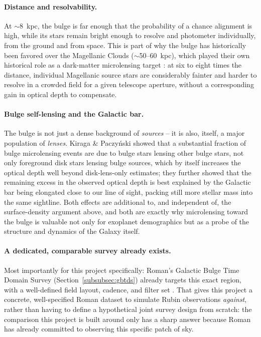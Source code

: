 \documentclass[english,10pt,a4paper]{article}
\begin{document}
	\paragraph{Distance and resolvability.} At $\sim$8~kpc, the bulge is far enough that the probability of a chance alignment is high, while its stars remain bright enough to resolve and photometer individually, from the ground and from space. This is part of why the bulge has historically been favored over the Magellanic Clouds ($\sim$50--60~kpc), which played their own historical role as a dark-matter microlensing target \cite{Paczynski1991}: at six to eight times the distance, individual Magellanic source stars are considerably fainter and harder to resolve in a crowded field for a given telescope aperture, without a corresponding gain in optical depth to compensate.
	
	\paragraph{Bulge self-lensing and the Galactic bar.} The bulge is not just a dense background of \emph{sources} -- it is also, itself, a major population of \emph{lenses}. Kiraga \& Paczy\'nski \cite{KiragaPaczynski1994} showed that a substantial fraction of bulge microlensing events are due to bulge stars lensing other bulge stars, not only foreground disk stars lensing bulge sources, which by itself increases the optical depth well beyond disk-lens-only estimates; they further showed that the remaining excess in the observed optical depth is best explained by the Galactic bar being elongated close to our line of sight, packing still more stellar mass into the same sightline. Both effects are additional to, and independent of, the surface-density argument above, and both are exactly why microlensing toward the bulge is valuable not only for exoplanet demographics but as a probe of the structure and dynamics of the Galaxy itself.
	
	\paragraph{A dedicated, comparable survey already exists.} Most importantly for this project specifically: Roman's Galactic Bulge Time Domain Survey (Section~\ref{subsubsec:gbtds}) already targets this exact region, with a well-defined field layout, cadence, and filter set \cite{ROTAC2025}. That gives this project a concrete, well-specified Roman dataset to simulate Rubin observations \emph{against}, rather than having to define a hypothetical joint survey design from scratch: the comparison this project is built around only has a sharp answer because Roman has already committed to observing this specific patch of sky.
	
\end{document}
